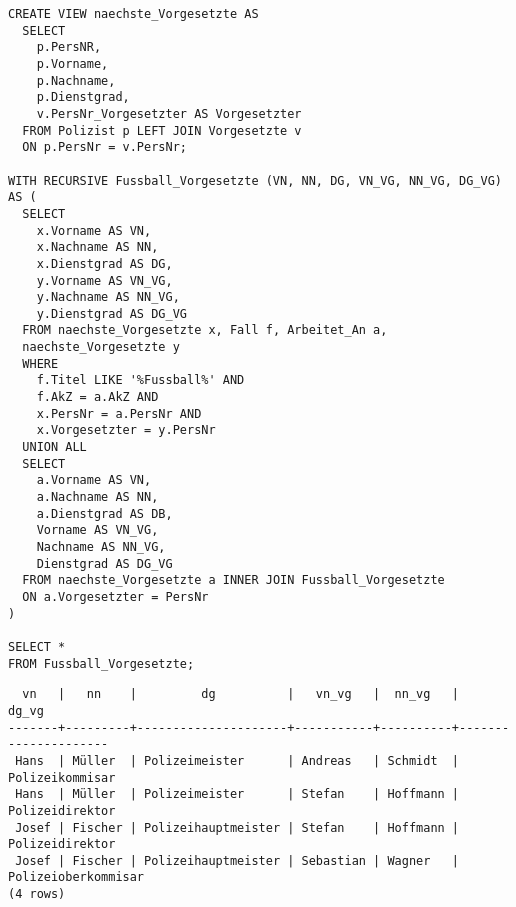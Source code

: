 \documentclass{bschlangaul-aufgabe}
\begin{document}
\begin{enumerate}
\begin{bAntwort}

\begin{verbatim}
CREATE VIEW naechste_Vorgesetzte AS
  SELECT
    p.PersNR,
    p.Vorname,
    p.Nachname,
    p.Dienstgrad,
    v.PersNr_Vorgesetzter AS Vorgesetzter
  FROM Polizist p LEFT JOIN Vorgesetzte v
  ON p.PersNr = v.PersNr;

WITH RECURSIVE Fussball_Vorgesetzte (VN, NN, DG, VN_VG, NN_VG, DG_VG) AS (
  SELECT
    x.Vorname AS VN,
    x.Nachname AS NN,
    x.Dienstgrad AS DG,
    y.Vorname AS VN_VG,
    y.Nachname AS NN_VG,
    y.Dienstgrad AS DG_VG
  FROM naechste_Vorgesetzte x, Fall f, Arbeitet_An a,
  naechste_Vorgesetzte y
  WHERE
    f.Titel LIKE '%Fussball%' AND
    f.AkZ = a.AkZ AND
    x.PersNr = a.PersNr AND
    x.Vorgesetzter = y.PersNr
  UNION ALL
  SELECT
    a.Vorname AS VN,
    a.Nachname AS NN,
    a.Dienstgrad AS DB,
    Vorname AS VN_VG,
    Nachname AS NN_VG,
    Dienstgrad AS DG_VG
  FROM naechste_Vorgesetzte a INNER JOIN Fussball_Vorgesetzte
  ON a.Vorgesetzter = PersNr
)

SELECT *
FROM Fussball_Vorgesetzte;
\end{verbatim}

\begin{verbatim}
  vn   |   nn    |         dg          |   vn_vg   |  nn_vg   |        dg_vg
-------+---------+---------------------+-----------+----------+---------------------
 Hans  | Müller  | Polizeimeister      | Andreas   | Schmidt  | Polizeikommisar
 Hans  | Müller  | Polizeimeister      | Stefan    | Hoffmann | Polizeidirektor
 Josef | Fischer | Polizeihauptmeister | Stefan    | Hoffmann | Polizeidirektor
 Josef | Fischer | Polizeihauptmeister | Sebastian | Wagner   | Polizeioberkommisar
(4 rows)
\end{verbatim}

\end{bAntwort}
\end{enumerate}
\end{document}
